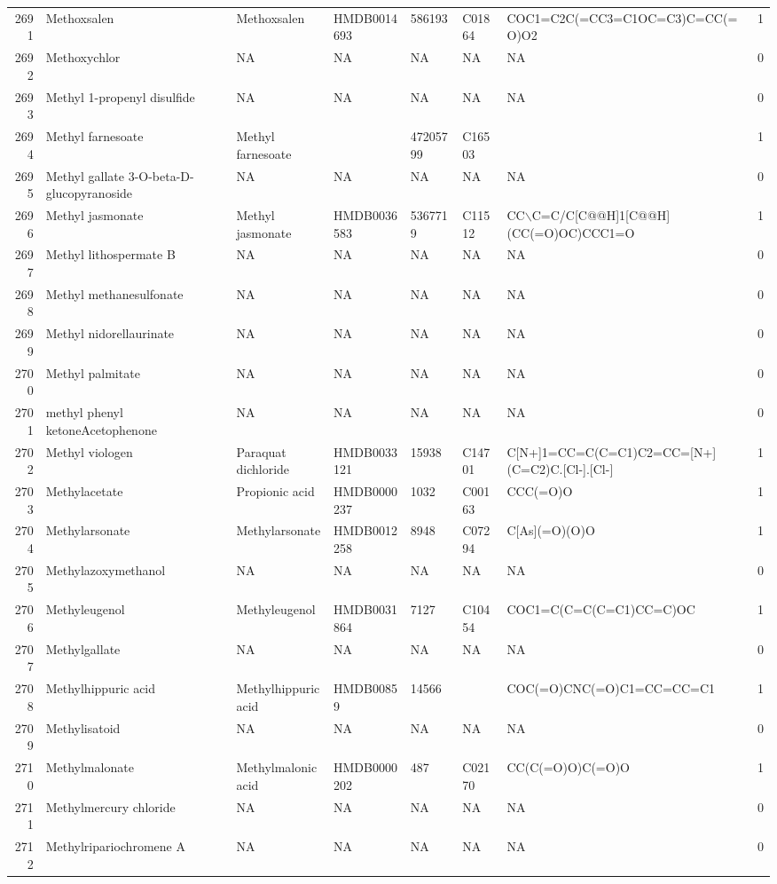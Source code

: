 \documentclass[a4paper]{article}
\begin{document}
\begin{longtable}{rlllllll}
  2691 & Methoxsalen & Methoxsalen & HMDB0014693 & 586193 & C01864 & COC1=C2C(=CC3=C1OC=C3)C=CC(=O)O2 & 1 \\ 
  2692 & Methoxychlor & NA & NA & NA & NA & NA & 0 \\ 
  2693 & Methyl 1-propenyl disulfide & NA & NA & NA & NA & NA & 0 \\ 
  2694 & Methyl farnesoate & Methyl farnesoate &  & 47205799 & C16503 &  & 1 \\ 
  2695 & Methyl gallate 3-O-beta-D-glucopyranoside & NA & NA & NA & NA & NA & 0 \\ 
  2696 & Methyl jasmonate & Methyl jasmonate & HMDB0036583 & 5367719 & C11512 & CC$\backslash$C=C/C[C@@H]1[C@@H](CC(=O)OC)CCC1=O & 1 \\ 
  2697 & Methyl lithospermate B & NA & NA & NA & NA & NA & 0 \\ 
  2698 & Methyl methanesulfonate & NA & NA & NA & NA & NA & 0 \\ 
  2699 & Methyl nidorellaurinate & NA & NA & NA & NA & NA & 0 \\ 
  2700 & Methyl palmitate & NA & NA & NA & NA & NA & 0 \\ 
  2701 & methyl phenyl ketoneAcetophenone & NA & NA & NA & NA & NA & 0 \\ 
  2702 & Methyl viologen & Paraquat dichloride & HMDB0033121 & 15938 & C14701 & C[N+]1=CC=C(C=C1)C2=CC=[N+](C=C2)C.[Cl-].[Cl-] & 1 \\ 
  2703 & Methylacetate & Propionic acid & HMDB0000237 & 1032 & C00163 & CCC(=O)O & 1 \\ 
  2704 & Methylarsonate & Methylarsonate & HMDB0012258 & 8948 & C07294 & C[As](=O)(O)O & 1 \\ 
  2705 & Methylazoxymethanol & NA & NA & NA & NA & NA & 0 \\ 
  2706 & Methyleugenol & Methyleugenol & HMDB0031864 & 7127 & C10454 & COC1=C(C=C(C=C1)CC=C)OC & 1 \\ 
  2707 & Methylgallate & NA & NA & NA & NA & NA & 0 \\ 
  2708 & Methylhippuric acid & Methylhippuric acid & HMDB00859 & 14566 &  & COC(=O)CNC(=O)C1=CC=CC=C1 & 1 \\ 
  2709 & Methylisatoid & NA & NA & NA & NA & NA & 0 \\ 
  2710 & Methylmalonate & Methylmalonic acid & HMDB0000202 & 487 & C02170 & CC(C(=O)O)C(=O)O & 1 \\ 
  2711 & Methylmercury chloride & NA & NA & NA & NA & NA & 0 \\ 
  2712 & Methylripariochromene A & NA & NA & NA & NA & NA & 0 \\ 

\end{longtable}
\end{document}
